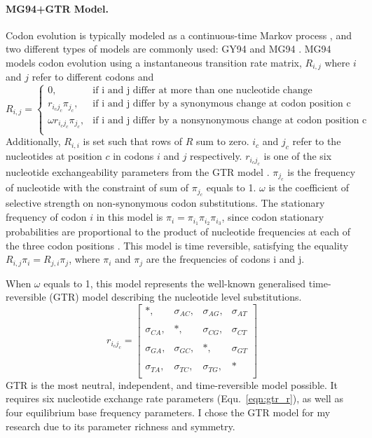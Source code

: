 \paragraph{MG94+GTR Model.} Codon evolution is typically modeled as a continuous-time Markov process \parencite{rodrigue2008bayesian}, and two different types of models are commonly used: GY94 and MG94 \parencite{muse1994likelihood, goldman1994codon}. MG94 models codon evolution using a instantaneous transition rate matrix, $R_{i,j}$ where $i$ and $j$ refer to different codons and
\[
R_{i,j} = \begin{cases}
                    0, & \text{if i and j differ at more than one nucleotide change}\\
                    r_{{i_c} {j_c}} \pi_{j_c}, & \text{if i and j differ by a synonymous change at codon position c}\\
                    \omega r_{{i_c} {j_c}} \pi_{j_c}, & \text{if i and j differ by a nonsynonymous change at codon position c}\\
          \end{cases}
\]
Additionally, $R_{i,i}$ is set such that rows of $R$ sum to zero. $i_c$ and $j_c$ refer to the nucleotides at position $c$ in codons $i$ and $j$ respectively. $r_{{i_c} {j_c}}$ is one of the six nucleotide exchangeability parameters from the GTR model \parencite{tavare1986some}. $\pi_{j_c}$ is the frequency of nucleotide with the constraint of sum of $\pi_{j_c}$ equals to 1. $\omega$ is the coefficient of selective strength on non-synonymous codon substitutions. The stationary frequency of codon $i$ in this model is $\pi_i = \pi_{i_1}\pi_{i_2}\pi_{i_3}$, since codon stationary probabilities are proportional to the product of nucleotide frequencies at each of the three codon positions \parencite{rodrigue2008bayesian}.
This model is time reversible, satisfying the equality $R_{i,j} \pi_i = R_{j,i} \pi_j$, where $\pi_i$ and  $\pi_j$ are the frequencies of codons i and j.   

 When $\omega$ equals to 1, this model represents the well-known generalised time-reversible (GTR) model \parencite{tavare1986some} describing the nucleotide level substitutions.
\begin{equation}
\label{eqn:gtr_r}
r_{{i_c} {j_c}} = \begin{bmatrix}
            *,&      \sigma_{AC},&  \sigma_{AG},&  \sigma_{AT} \\\\
            \sigma_{CA},&  *,&       \sigma_{CG},&  \sigma_{CT} \\\\
            \sigma_{GA},&  \sigma_{GC},& *,&       \sigma_{GT} \\\\
            \sigma_{TA},&  \sigma_{TC},&  \sigma_{TG},&  * \\
          \end{bmatrix}
\end{equation}
GTR is the most neutral, independent, and time-reversible model possible. It requires six nucleotide exchange rate parameters (Equ.\ \ref{eqn:gtr_r}), as well as four equilibrium base frequency parameters. I chose the GTR model for my research due to its parameter richness and symmetry.


